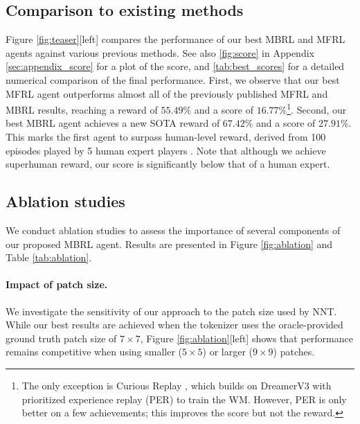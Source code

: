\subsection{Comparison to existing methods}
\label{sec:cmp}

Figure \ref{fig:teaser}[left]
compares the performance of our best MBRL and MFRL agents against various previous methods. 
See also \cref{fig:score} in Appendix \ref{sec:appendix_score}
for a plot of the score,
and  \cref{tab:best_scores}
for a detailed numerical comparison
of the final performance.
First, we observe that our best MFRL agent outperforms almost
all of the previously published MFRL and MBRL results,
reaching a reward of $55.49\%$
and a score of $16.77\%$\footnote{
%
The only exception is Curious Replay \citep{Kauvar2023}, which builds on DreamerV3 with prioritized experience replay (PER)
to train the WM.
However, 
PER is only better
on a few achievements;
this improves the score but not the reward.
}.
Second, our best MBRL agent
achieves a new SOTA  reward of $67.42\%$
and a score of $27.91\%$.
This marks the first agent to surpass human-level reward, derived from 100 episodes played by 5 human expert players \citep{hafner2021benchmarking}.
Note that although we achieve superhuman reward, our score is significantly below that of a human expert.


\subsection{Ablation studies}
\label{sec:ablations}

We conduct ablation studies to assess the importance of several components of our proposed MBRL agent.
Results are presented in Figure \ref{fig:ablation} and Table \ref{tab:ablation}.

\paragraph{Impact of patch size.} We investigate the sensitivity of our approach to the patch size used by NNT. While our best results are achieved when the tokenizer uses the oracle-provided ground truth patch size of $7\times 7$, Figure \ref{fig:ablation}[left] shows that performance remains competitive when using smaller ($5\times 5$) or larger ($9\times 9$) patches.

